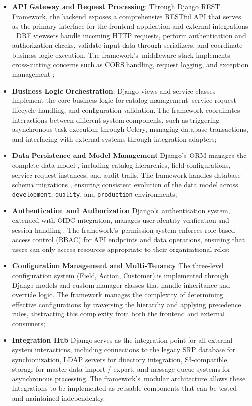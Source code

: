 \begin{itemize}
  \item \textbf{API Gateway and Request Processing}: Through Django REST Framework, the backend exposes a comprehensive RESTful API that serves as the primary interface for the frontend application and external integrations \cite{django_rest_framework}. DRF viewsets handle incoming HTTP requests, perform authentication and authorization checks, validate input data through serializers, and coordinate business logic execution. The framework's~middleware stack implements cross-cutting concerns such as CORS handling, request logging, and exception management \cite{django_rest_framework};
  \item \textbf{Business Logic Orchestration}: Django views and service classes implement the core business logic for catalog management, service request lifecycle handling, and configuration validation. The framework coordinates interactions between different system components, such as triggering asynchronous task execution through Celery, managing database transactions, and interfacing with external systems through integration adapters;
  \item \textbf{Data Persistence and Model Management} Django's~ORM manages the complete data model \cite{django}, including catalog hierarchies, field configurations, service request instances, and audit trails. The framework handles database schema migrations \cite{django}, ensuring consistent evolution of the data model across \texttt{development}, \texttt{quality}, and \texttt{production} environments;
  \item \textbf{Authentication and Authorization} Django's~authentication system, extended with OIDC integration, manages user identity verification and session handling \cite{django}. The framework's~permission system enforces role-based access control (RBAC) for API endpoints and data operations, ensuring that users can only access resources appropriate to their organizational roles;
  \item \textbf{Configuration Management and Multi-Tenancy} The three-level configuration system (Field, Action, Customer) is implemented through Django models and custom manager classes that handle inheritance and override logic. The framework manages the complexity of determining effective configurations by traversing the hierarchy and applying precedence rules, abstracting this complexity from both the frontend and external consumers;
  \item \textbf{Integration Hub} Django serves as the integration point for all external system interactions, including connections to the legacy SRP database for synchronization, LDAP servers for directory integration, S3-compatible storage for master data import / export, and message queue systems for asynchronous processing. The framework's~modular architecture allows these integrations to be implemented as reusable components that can be tested and maintained independently.
\end{itemize}

